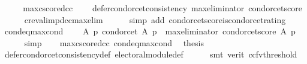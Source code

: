 \begin{isabellebody}
%
\endisadelimproof
%
\isatagproof
{}\isamarkupfalse%
\ {\isacharminus}{\kern0pt}\isanewline
\ \ \isamarkupfalse%
\ max{\isacharunderscore}{\kern0pt}cscore{\isacharunderscore}{\kern0pt}dcc{\isacharcolon}{\kern0pt}\isanewline
\ \ \ \ {\isachardoublequoteopen}defer{\isacharunderscore}{\kern0pt}condorcet{\isacharunderscore}{\kern0pt}consistency\ {\isacharparenleft}{\kern0pt}max{\isacharunderscore}{\kern0pt}eliminator\ condorcet{\isacharunderscore}{\kern0pt}score{\isacharparenright}{\kern0pt}{\isachardoublequoteclose}\isanewline
\ \ \ \ \isamarkupfalse%
\ cr{\isacharunderscore}{\kern0pt}eval{\isacharunderscore}{\kern0pt}imp{\isacharunderscore}{\kern0pt}dcc{\isacharunderscore}{\kern0pt}max{\isacharunderscore}{\kern0pt}elim\isanewline
\ \ \ \ \isamarkupfalse%
\ {\isacharparenleft}{\kern0pt}simp\ add{\isacharcolon}{\kern0pt}\ condorcet{\isacharunderscore}{\kern0pt}score{\isacharunderscore}{\kern0pt}is{\isacharunderscore}{\kern0pt}condorcet{\isacharunderscore}{\kern0pt}rating{\isacharparenright}{\kern0pt}\isanewline
\ \ \isamarkupfalse%
\ cond{\isacharunderscore}{\kern0pt}eq{\isacharunderscore}{\kern0pt}max{\isacharunderscore}{\kern0pt}cond{\isacharcolon}{\kern0pt}\isanewline
\ \ \ \ {\isachardoublequoteopen}{\isasymAnd}A\ p{\isachardot}{\kern0pt}\ {\isacharparenleft}{\kern0pt}condorcet\ A\ p\ {\isasymequiv}\ max{\isacharunderscore}{\kern0pt}eliminator\ condorcet{\isacharunderscore}{\kern0pt}score\ A\ p{\isacharparenright}{\kern0pt}{\isachardoublequoteclose}\isanewline
\ \ \ \ \isamarkupfalse%
\ simp\isanewline
\ \ \isamarkupfalse%
\ max{\isacharunderscore}{\kern0pt}cscore{\isacharunderscore}{\kern0pt}dcc\ cond{\isacharunderscore}{\kern0pt}eq{\isacharunderscore}{\kern0pt}max{\isacharunderscore}{\kern0pt}cond\ \isamarkupfalse%
\ {\isacharquery}{\kern0pt}thesis\isanewline
\ \ \ \ \isamarkupfalse%
\ defer{\isacharunderscore}{\kern0pt}condorcet{\isacharunderscore}{\kern0pt}consistency{\isacharunderscore}{\kern0pt}def\ electoral{\isacharunderscore}{\kern0pt}module{\isacharunderscore}{\kern0pt}def\isanewline
\ \ \ \ \isamarkupfalse%
\ {\isacharparenleft}{\kern0pt}smt\ {\isacharparenleft}{\kern0pt}verit{\isacharcomma}{\kern0pt}\ ccfv{\isacharunderscore}{\kern0pt}threshold{\isacharparenright}{\kern0pt}{\isacharparenright}{\kern0pt}\isanewline
{}\isamarkupfalse%
%
\endisatagproof
{\isafoldproof}%
%
\isadelimproof
\isanewline
%
\endisadelimproof
%
\isadelimtheory
\isanewline
%
\endisadelimtheory
%
\isatagtheory
{}\isamarkupfalse%
%
\endisatagtheory
{\isafoldtheory}%
%
\isadelimtheory
%
\endisadelimtheory
%
\end{isabellebody}%
